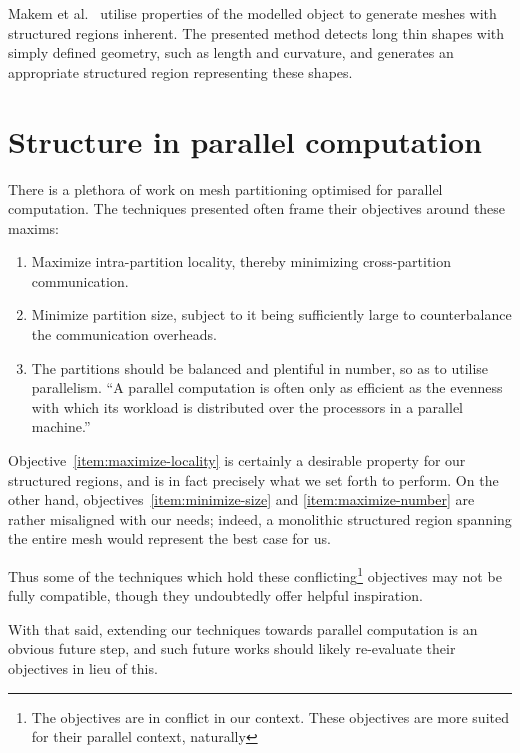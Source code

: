 Makem et al.~\cite{makem2012automatic} utilise properties of the modelled object to generate meshes with structured regions inherent. The presented method detects long thin shapes with simply defined geometry, such as length and curvature, and generates an appropriate structured region representing these shapes.



\section{Structure in parallel computation}
There is a plethora of work on mesh partitioning optimised for parallel computation. The techniques presented often frame their objectives around these maxims:
\begin{enumerate}
\item \label{item:maximize-locality} Maximize intra-partition locality, thereby minimizing cross-partition communication.
\item \label{item:minimize-size} Minimize partition size, subject to it being sufficiently large to counterbalance the communication overheads.
\item \label{item:maximize-number} The partitions should be balanced and plentiful in number, so as to utilise parallelism.
``A parallel computation is often only as efficient as the evenness with which its workload is distributed over the processors in a parallel machine.''
\end{enumerate}

Objective~\ref{item:maximize-locality} is certainly a desirable property for our structured regions, and is in fact precisely what we set forth to perform.
On the other hand, objectives~\ref{item:minimize-size} and \ref{item:maximize-number} are rather misaligned with our needs; indeed, a monolithic structured region spanning the entire mesh would represent the best case for us.

Thus some of the techniques which hold these conflicting\footnote{The objectives are in conflict in our context. These objectives are more suited for their parallel context, naturally} objectives may not be fully compatible, though they undoubtedly offer helpful inspiration.

With that said, extending our techniques towards parallel computation is an obvious future step, and such future works should likely re-evaluate their objectives in lieu of this.





